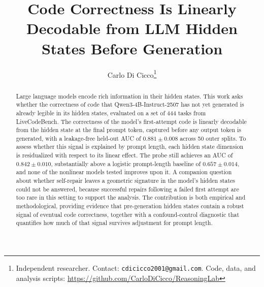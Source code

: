 \documentclass[11pt]{article}
\title{\textbf{Code Correctness Is Linearly Decodable from LLM Hidden States Before Generation}}
\author{Carlo Di Cicco\thanks{Independent researcher. Contact: \texttt{cdicicco2001@gmail.com}. Code, data, and analysis scripts: \url{https://github.com/CarloDiCicco/ReasoningLab}}}
\date{}
\begin{document}
\maketitle

\begin{abstract}
Large language models encode rich information in their hidden states. 
This work asks whether the correctness of code that Qwen3-4B-Instruct-2507 has not yet generated is already legible in its hidden states, evaluated on a set of 444 tasks from LiveCodeBench.
The correctness of the model's first-attempt code is linearly decodable from the hidden state at the final prompt token, captured before any output token is generated, with a leakage-free held-out AUC of $0.881 \pm 0.008$ across 50 outer splits. 
To assess whether this signal is explained by prompt length, each hidden state dimension is residualized with respect to its linear effect. The probe still achieves an AUC of $0.842 \pm 0.010$, substantially above a logistic prompt-length baseline of $0.657 \pm 0.014$, and none of the nonlinear models tested improves upon it. 
A companion question about whether self-repair leaves a geometric signature in the model's hidden states could not be answered, because successful repairs following a failed first attempt are too rare in this setting to support the analysis. 
The contribution is both empirical and methodological, providing evidence that pre-generation hidden states contain a robust signal of eventual code correctness, together with a confound-control diagnostic that quantifies how much of that signal survives adjustment for prompt length.
\end{abstract}









\end{document}

